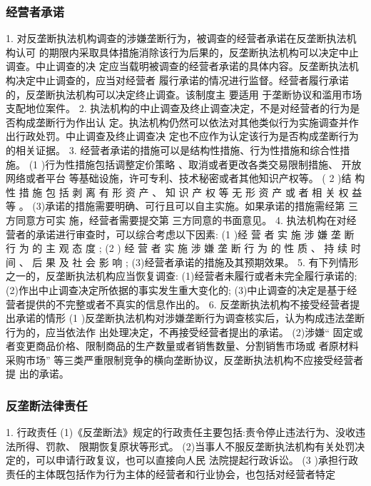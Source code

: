 \documentclass[UTF8,12pt]{ctexart}
\numberwithin{equation}{section} %
\numberwithin{figure}{section}
\numberwithin{table}{section}
\begin{document}
	\subsubsection{经营者承诺}
	1. 对反垄断执法机构调查的涉嫌垄断行为，被调查的经营者承诺在反垄断执法机构认可
	的期限内采取具体措施消除该行为后果的，反垄断执法机构可以决定中止调查。中止调查的决
	定应当载明被调查的经营者承诺的具体内容。反垄断执法机构决定中止调查的，应当对经营者
	履行承诺的情况进行监督。经营者履行承诺的，反垄断执法机构可以决定终止调查。该制度主
	要适用 于垄断协议和滥用市场支配地位案件。
	2. 执法机构的中止调查及终止调查决定，不是对经营者的行为是否构成垄断行为作出认
	定。执法机构仍然可以依法对其他类似行为实施调查并作出行政处罚。中止调查及终止调查决
	定也不应作为认定该行为是否构成垄断行为的相关证据。
	3. 经营者承诺的措施可以是结构性措施、行为性措施和综合性措施。
	(1 )行为性措施包括调整定价策略 、取消或者更改各类交易限制措施、 开放网络或者平台
	等基础设施，许可专利、技术秘密或者其他知识产权等。
	( 2 )结 构 性 措 施 包 括 剥 离 有 形 资 产 、 知 识 产 权 等 无 形 资 产 或 者 相 关 权 益 等 。
	(3)承诺的措施需要明确、可行且可以自主实施。如果承诺的措施需经第 三方同意方可实
	施，经营者需要提交第 三方同意的书面意见。
	4. 执法机构在对经营者的承诺进行审查时，可以综合考虑以下因素:
	(1 )经 营 者 实 施 涉 嫌 垄 断 行 为 的 主 观 态 度 ;
	(2 ) 经 营 者 实 施 涉 嫌 垄 断 行 为 的 性 质 、 持 续 时 间 、 后 果 及 社 会 影 响 ;
	(3)经营者承诺的措施及其预期效果。
	5. 有下列情形之一的，反垄断执法机构应当恢复调查:
	(1)经营者未履行或者未完全履行承诺的;
	(2)作出中止调查决定所依据的事实发生重大变化的;
	(3)中止调查的决定是基于经营者提供的不完整或者不真实的信息作出的。
	6. 反垄断执法机构不接受经营者提出承诺的情形
	(1 )反垄断执法机构对涉嫌垄断行为调查核实后，认为构成违法垄断行为的，应当依法作
	出处理决定，不再接受经营者提出的承诺。
	(2)涉嫌“ 固定或者变更商品价格、限制商品的生产数量或者销售数量、分割销售市场或
	者原材料采购市场” 等三类严重限制竞争的横向垄断协议，反垄断执法机构不应接受经营者提
	出的承诺。
	
	\subsubsection{反垄断法律责任}
	1. 行政责任
	(1)《反垄断法》规定的行政责任主要包括:责令停止违法行为、没收违法所得、罚款、
	限期恢复原状等形式。
	(2)当事人不服反垄断执法机构有关处罚决定的，可以申请行政复议，也可以直接向人民
	法院提起行政诉讼。
	(3 )承担行政责任的主体既包括作为行为主体的经营者和行业协会，也包括对经营者特定
	
\end{document}
